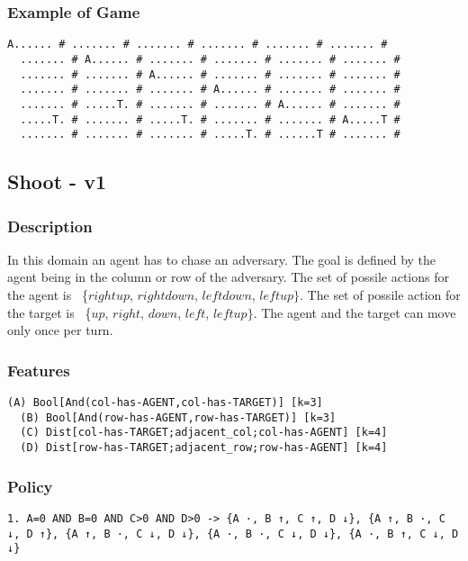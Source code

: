 \documentclass[a4paper]{article}
\begin{document}
\subsubsection{Example of Game}
\begin{Verbatim}[fontsize=\footnotesize]
  A...... # ....... # ....... # ....... # ....... # ....... #
  ....... # A...... # ....... # ....... # ....... # ....... #
  ....... # ....... # A...... # ....... # ....... # ....... #
  ....... # ....... # ....... # A...... # ....... # ....... #
  ....... # .....T. # ....... # ....... # A...... # ....... #
  .....T. # ....... # .....T. # ....... # ....... # A.....T #
  ....... # ....... # ....... # .....T. # ......T # ....... #
\end{Verbatim}

\subsection{Shoot - v1}
\subsubsection{Description}
In this domain an agent has to chase an adversary. The goal is defined by the agent being in the column or row of the adversary. The set of possile actions for the agent is ~\{$rightup$, $rightdown$, $leftdown$, $leftup\}$.
The set of possile action for the target is ~\{$up$, $right$, $down$, $left$, $leftup\}$.  The agent and the target can move only once per turn.

\subsubsection{Features}
\begin{Verbatim}[fontsize=\footnotesize]
  (A) Bool[And(col-has-AGENT,col-has-TARGET)] [k=3]
  (B) Bool[And(row-has-AGENT,row-has-TARGET)] [k=3]
  (C) Dist[col-has-TARGET;adjacent_col;col-has-AGENT] [k=4]
  (D) Dist[row-has-TARGET;adjacent_row;row-has-AGENT] [k=4]

\end{Verbatim}

\subsubsection{Policy}
\begin{Verbatim}[fontsize=\footnotesize]
  1. A=0 AND B=0 AND C>0 AND D>0 -> {A ·, B ↑, C ↑, D ↓}, {A ↑, B ·, C ↓, D ↑}, {A ↑, B ·, C ↓, D ↓}, {A ·, B ·, C ↓, D ↓}, {A ·, B ↑, C ↓, D ↓}

\end{Verbatim}
\end{document}
